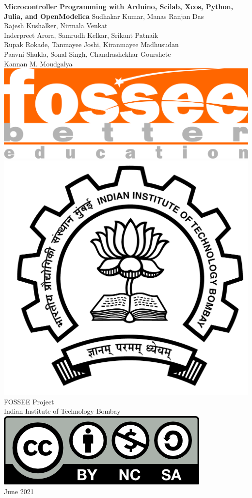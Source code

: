 \begin{center}
    {\bf {\Huge Microcontroller Programming with Arduino, Scilab, Xcos,
            Python, Julia, and OpenModelica}}
    \vfill
    Sudhakar Kumar, Manas Ranjan Das \\
    Rajesh Kushalker, Nirmala Venkat \\
    Inderpreet Arora, Samrudh Kelkar, Srikant Patnaik \\
    Rupak Rokade, Tanmayee Joshi, Kiranmayee Madhusudan \\
    Paavni Shukla, Sonal Singh, Chandrashekhar Gourshete \\
    Kannan M. Moudgalya \\
    \vfill
    \includegraphics[width=0.3\linewidth]{suppl/fossee_logo_hi.png} \quad
    \includegraphics[width=0.2\linewidth]{suppl/IITB-logo-HighRes.png} \\
    FOSSEE Project \\
    Indian Institute of Technology Bombay \\ [2mm]
    \includegraphics[width=0.15\linewidth]{suppl/by-nc-sa.png} \\ [1mm]
    June 2021
\end{center}

\clearpage
